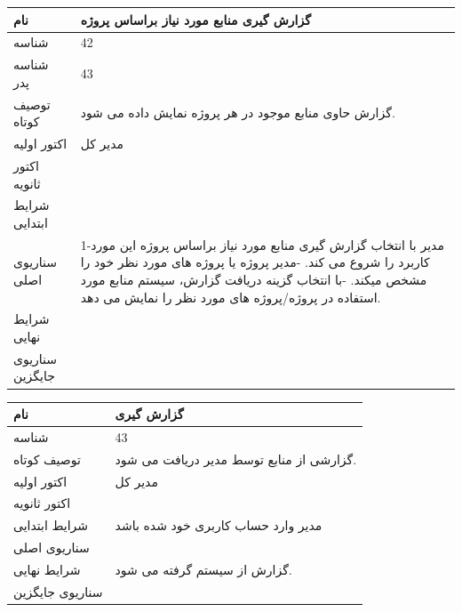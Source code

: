 \documentclass{article}
\begin{document}
\vspace{2cm}

\begin{tabular}{|p{2cm}|p{10cm}|}
\hline
نام
&
گزارش گیری منابع مورد نیاز براساس پروژه
\\
\hline
شناسه
&
42
\\
\hline
شناسه پدر
&
43
\\
\hline
توصیف کوتاه
&
گزارش حاوی منابع موجود در هر پروژه نمایش داده می شود.
\\
\hline
اکتور اولیه
&
مدیر کل
\\
\hline
اکتور ثانویه
&

\\
\hline
شرایط ابتدایی
&

\\
\hline
سناریوی اصلی
&
1-مدیر با انتخاب گزارش گیری منابع مورد نیاز براساس پروژه این مورد کاربرد را شروع می کند.
\newline
2-مدیر پروژه یا پروژه های مورد نظر خود را مشخص میکند. 
\newline
3-با انتخاب گزینه دریافت گزارش، سیستم  منابع مورد استفاده در پروژه/پروژه های مورد نظر را نمایش می دهد. 

\\
\hline
شرایط نهایی
&

\\
\hline
سناریوی جایگزین
&

\\
\hline
\end{tabular}

\vspace{2cm}

\begin{tabular}{|p{2cm}|p{10cm}|}
\hline
نام
&
گزارش گیری
\\
\hline
شناسه
&
43
\\
\hline
توصیف کوتاه
&
گزارشی از منابع توسط مدیر دریافت می شود.
\\
\hline
اکتور اولیه
&
مدیر کل 
\\
\hline
اکتور ثانویه
&

\\
\hline
شرایط ابتدایی
&
مدیر وارد حساب کاربری خود شده باشد
\\
\hline
سناریوی اصلی
&

\\
\hline
شرایط نهایی
&
گزارش از سیستم گرفته می شود.
\\
\hline
سناریوی جایگزین
&

\\
\hline
\end{tabular}
\end{document}
